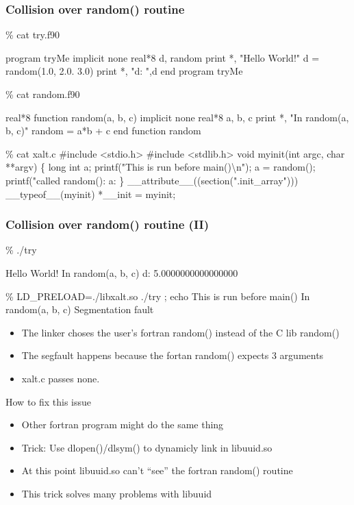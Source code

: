\documentclass{beamer}
\begin{document}
\begin{frame}[fragile]
    \frametitle{Collision over random() routine}
 {\tiny
    \begin{semiverbatim}
\% cat try.f90

program tryMe
   implicit none 
   real*8 d, random
   print *, "Hello World!"
   d = {\color{blue}{}random(1.0, 2.0. 3.0)}
   print *, "d: ",d
end program tryMe

\% cat random.f90

real*8 function {\color{blue}{}random(a, b, c)}
   implicit none
   real*8 a, b, c
   print *, "In random(a, b, c)"
   random = a*b + c
end function random

\% cat xalt.c
#include <stdio.h>
#include <stdlib.h>
void myinit(int argc, char **argv)
\{
  long int a;
  printf("This is run before main()\textbackslash{}n");
  a = {\color{red}{}random()};
  printf("called random(): a: %
\}
__attribute__((section(".init_array"))) __typeof__(myinit) *__init = myinit;

\end{semiverbatim}
}
\end{frame}

\begin{frame}[fragile]
    \frametitle{Collision over random() routine (II)}
 {\tiny
    \begin{semiverbatim}
\% ./try

 Hello World!
 In random(a, b, c)
 d:    5.0000000000000000     

\% LD_PRELOAD=./libxalt.so  ./try  ; echo
This is run before main()
 In random(a, b, c)
Segmentation fault
    \end{semiverbatim}
}
  \begin{itemize}
    \item The linker choses the user's fortran random() instead of the C lib
      random()
    \item The segfault happens because the fortan random() expects 3
      arguments
    \item xalt.c passes none.
  \end{itemize}

\end{frame}

\begin{frame}{How to fix this issue}
  \begin{itemize}
    \item Other fortran program might do the same thing
    \item Trick: Use dlopen()/dlsym() to dynamicly link in libuuid.so
    \item At this point libuuid.so can't ``see'' the fortran random()
      routine
    \item This trick solves many problems with libuuid
  \end{itemize}
\end{frame}
\end{document}
